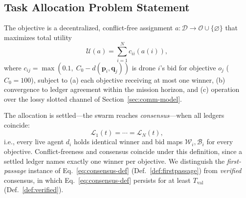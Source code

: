 \subsection{Task Allocation Problem Statement}\label{sec:problem-statement}
The objective is a decentralized, conflict-free assignment $a: \mathcal{D} \to \mathcal{O} \cup \{\varnothing\}$ that maximizes total utility
\begin{equation}
    \mathcal{U}(a) = \textstyle\sum_{i=1}^{N} c_{ii}\!\left(a(i)\right),
    \label{eq:utility}
\end{equation}
where $c_{ij} = \max(0.1,\; C_0 - d(\mathbf{p}_i, \mathbf{q}_j))$ is drone $i$'s bid for objective $o_j$ ($C_0 = 100$), subject to (a) each objective receiving at most one winner, (b) convergence to ledger agreement within the mission horizon, and (c) operation over the lossy slotted channel of Section~\ref{sec:comm-model}.
\begin{definition}\label{def:eventual}
The allocation is settled---the swarm reaches \emph{consensus}---when all ledgers coincide:
\begin{equation}
    \mathcal{L}_1(t) = \cdots = \mathcal{L}_N(t),
    \label{eq:consensus-def}
\end{equation}
i.e., every live agent $d_i$ holds identical winner and bid maps $\mathcal{W}_i, \mathcal{B}_i$ for every objective.
Conflict-freeness and consensus coincide under this definition, since a settled ledger names exactly one winner per objective.
We distinguish the \emph{first-passage} instance of Eq.~\eqref{eq:consensus-def} (Def.~\ref{def:firstpassage}) from \emph{verified} consensus, in which Eq.~\eqref{eq:consensus-def} persists for at least $T_{\mathrm{val}}$ (Def.~\ref{def:verified}).
\end{definition}
